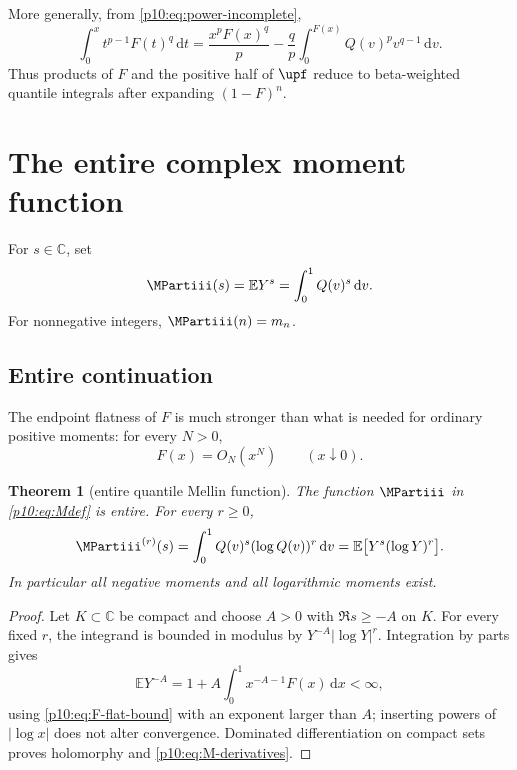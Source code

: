 \documentclass[11pt,oneside]{article}
\newtheorem{theorem}{Theorem}[section]
\theoremstyle{definition}
\theoremstyle{remark}
\newcommand{\F}{F}
\newcommand{\Q}{Q}
\newcommand{\E}{\mathbb E}
\newcommand{\C}{\mathbb C}
\newcommand{\dd}{\,\mathrm d}
\newcommand{\1}{\mathbf 1}
\begin{document}
More generally, from \cref{p10:eq:power-incomplete},
\begin{equation}\label{p10:eq:Fpower-antiderivative}
 \int_0^x t^{p-1}\F(t)^q\dd t
 =\frac{x^p\F(x)^q}{p}
 -\frac{q}{p}\int_0^{\F(x)}\Q(v)^p v^{q-1}\dd v.
\end{equation}
Thus products of \(\F\) and the positive half of \(\upf\) reduce to beta-weighted
quantile integrals after expanding \((1-\F)^n\).

\section{The entire complex moment function}

\begin{definition}\label{p10:def:M}
For \(s\in\C\), set
\begin{equation}\label{p10:eq:Mdef}
 \MPartiii(s)=\E Y^s=\int_0^1\Q(v)^s\dd v.
\end{equation}
For nonnegative integers, \(\MPartiii(n)=m_n\).
\end{definition}

\subsection{Entire continuation}

The endpoint flatness of \(\F\) is much stronger than what is needed for ordinary
positive moments: for every \(N>0\),
\begin{equation}\label{p10:eq:F-flat-bound}
 \F(x)=O_N(x^N)\qquad(x\downarrow0).
\end{equation}

\begin{theorem}[entire quantile Mellin function]\label{p10:thm:entireM}
The function \(\MPartiii\) in \cref{p10:eq:Mdef} is entire.  For every \(r\ge0\),
\begin{equation}\label{p10:eq:M-derivatives}
 \MPartiii^{(r)}(s)=\int_0^1\Q(v)^s(\log\Q(v))^r\dd v
 =\E\bigl[Y^s(\log Y)^r\bigr].
\end{equation}
In particular all negative moments and all logarithmic moments exist.
\end{theorem}

\begin{proof}
Let \(K\subset\C\) be compact and choose \(A>0\) with \(\Re s\ge-A\) on \(K\).
For every fixed \(r\), the integrand is bounded in modulus by
\(Y^{-A}|\log Y|^r\).  Integration by parts gives
\[
 \E Y^{-A}=1+A\int_0^1x^{-A-1}\F(x)\dd x<\infty,
\]
using \cref{p10:eq:F-flat-bound} with an exponent larger than \(A\); inserting powers of
\(|\log x|\) does not alter convergence.  Dominated differentiation on compact sets
proves holomorphy and \cref{p10:eq:M-derivatives}.
\end{proof}
\end{document}
